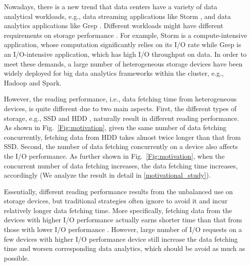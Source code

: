 \documentclass[conference]{IEEEtran}
\begin{document}
Nowadays, there is a new trend that data centers have a variety of data analytical workloads, e.g., data streaming applications like Storm
\cite{b40}, and data analytics applications like Grep \cite{b27}. Different workloads might have different requirements on storage performance \cite{b28} \cite{b29} \cite{b30} \cite{b31}. For example, Storm is a compute-intensive application, whose computation significantly relies on its I/O rate while Grep is an I/O-intensive application, which has high I/O throughput on data. In order to meet these demands, a large number of heterogeneous storage devices \cite{b6} have been widely deployed for big data analytics frameworks within the cluster, e.g., Hadoop \cite{b14} and Spark\cite{b15}.

However, the reading performance, i.e., data fetching time from heterogeneous devices, is quite different due to two main aspects. 
First, the different types of storage, e.g., SSD \cite{b32} and HDD \cite{b33}, naturally result in different reading performance. 
As shown in Fig.~\ref{Fig:motivation}, given the same number of data fetching concurrently, fetching data from HDD takes almost twice longer than that from SSD. 
Second, the number of data fetching concurrently on a device also affects the I/O performance. As further shown in Fig.~\ref{Fig:motivation}, when the concurrent number of data fetching increases, the data fetching time increases, accordingly (We analyze the result in detail in \ref{motivational_study}). %

Essentially, different reading performance results from the unbalanced use on storage devices, but traditional strategies \cite{b2} \cite{b3} \cite{b4} \cite{b5} often ignore to avoid it and incur relatively longer data fetching time. 
More specifically, fetching data from the devices with higher I/O performance actually earns shorter time than that from those with lower I/O performance \cite{b7}. %
However, large number of I/O requests on a few devices with higher I/O performance device still increase the data fetching time and worsen corresponding data analytics, which should be avoid as much as possible. 
\end{document}

